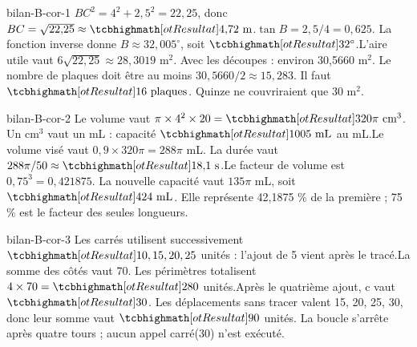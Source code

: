 \begin{blocEdition}{bilan-B-cor-1}
$BC^2=4^2+2{,}5^2=22{,}25$, donc $BC=\sqrt{22{,}25}\approx\res{4{,}72\text{ m}}$.$\tan B=2{,}5/4=0{,}625$. La fonction inverse donne $B\approx32{,}005^\circ$, soit $\res{32^\circ}$.L’aire utile vaut $6\sqrt{22{,}25}\approx28{,}3019$ m$^2$. Avec les découpes : environ 30,5660 m$^2$. Le nombre de plaques doit être au moins $30{,}5660/2\approx15{,}283$. Il faut $\res{16\text{ plaques}}$. Quinze ne couvriraient que 30 m$^2$.\label{fig-bilan-B-cor-1}

\end{blocEdition}
\begin{blocEdition}{bilan-B-cor-2}
Le volume vaut $\pi\times4^2\times20=\res{320\pi\text{ cm}^3}$. Un cm$^3$ vaut un mL : capacité $\res{1005\text{ mL}}$ au mL.Le volume visé vaut $0{,}9\times320\pi=288\pi$ mL. La durée vaut $288\pi/50\approx\res{18{,}1\text{ s}}$.Le facteur de volume est $0{,}75^3=0{,}421875$. La nouvelle capacité vaut $135\pi$ mL, soit $\res{424\text{ mL}}$. Elle représente 42,1875 \% de la première ; 75 \% est le facteur des seules longueurs.\label{fig-bilan-B-cor-2}

\end{blocEdition}
\begin{blocEdition}{bilan-B-cor-3}
Les carrés utilisent successivement $\res{10,15,20,25}$ unités : l’ajout de 5 vient après le tracé.La somme des côtés vaut 70. Les périmètres totalisent $4\times70=\res{280}$ unités.Après le quatrième ajout, c vaut $\res{30}$. Les déplacements sans tracer valent 15, 20, 25, 30, donc leur somme vaut $\res{90}$ unités. La boucle s’arrête après quatre tours ; aucun appel carré(30) n’est exécuté.\label{fig-bilan-B-cor-3}

\end{blocEdition}
